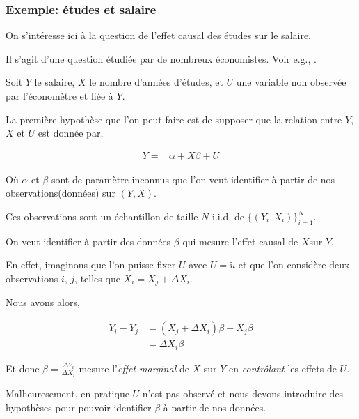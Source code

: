 \begin{frame}[allowframebreaks]\frametitle{Exemple: études et salaire}

On s'intéresse ici à la question de l'effet causal des études sur le
salaire.

\medskip

Il s'agit d'une question étudiée par de nombreux économistes. Voir
e.g., \cite{card2001estimating}.

\medskip

Soit $Y$ le salaire, $X$ le nombre d'années d'études, et $U$
une variable non observée par l'économètre et liée à $Y$.

\medskip

La première hypothèse que l'on peut faire est de supposer que la
relation entre $Y$, $X$ et $U$ est donnée par,

\begin{align*}
Y =& \alpha +  X\beta + U
\end{align*}

Où $\alpha$ et $\beta$ sont de paramètre inconnus que l'on veut
identifier à partir de nos observations(données) sur $(Y, X)$.

\medskip

Ces observations sont un échantillon de taille $N$ i.i.d, de $\{(Y_i, X_i)\}_{i=1}^N$.

\medskip

On veut identifier à partir des données $\beta$ qui mesure l'effet causal de $X$sur $Y$. 

\medskip

En effet, imaginons que l'on puisse fixer $U$ avec $U=\tilde{u}$ et
que l'on considère deux observations $i$, $j$, telles que $X_i = X_j +
\Delta X_i$.

\medskip

Nous avons alors,

\begin{align*}
Y_i - Y_j &= (X_j + \Delta X_i)\beta - X_j\beta\\
&= \Delta X_i \beta
\end{align*}

Et donc $\beta = \frac{\Delta Y_i}{\Delta X_i}$ mesure l'\emph{effet
  marginal} de $X$ sur $Y$ en \emph{contrôlant} les effets de
$U$.

\medskip

Malheuresement, en pratique $U$ n'est pas observé et nous devons
introduire des hypothèses pour pouvoir identifier $\beta$ à partir de
nos données.


\end{frame}
